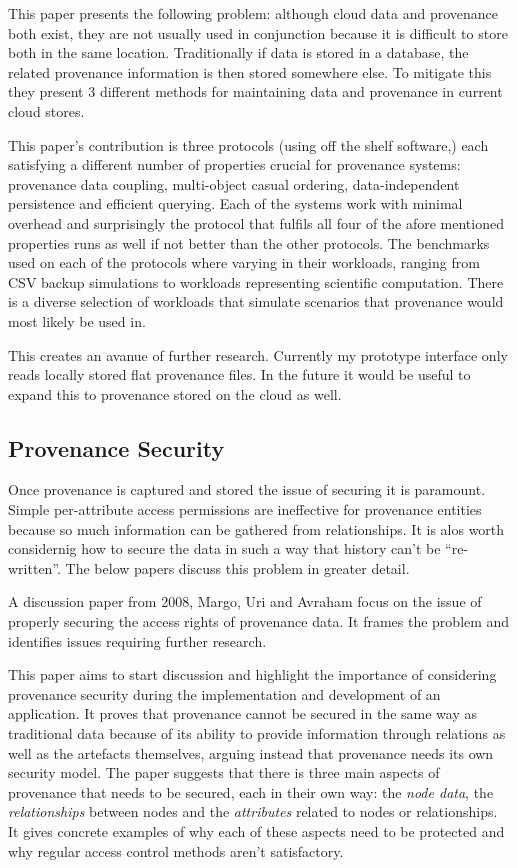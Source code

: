 This paper presents the following problem: although cloud data and provenance both exist, they are not usually used in conjunction because it is difficult to store both in the same location. Traditionally if data is stored in a database, the related provenance information is then stored somewhere else. To mitigate this they present 3 different methods for maintaining data and provenance in current cloud stores.

This paper's contribution is three protocols (using off the shelf software,) each satisfying a different number of properties crucial for provenance systems: provenance data coupling, multi-object casual ordering, data-independent persistence and efficient querying. Each of the systems work with minimal overhead and surprisingly the protocol that fulfils all four of the afore mentioned properties runs as well if not better than the other protocols. The benchmarks used on each of the protocols where varying in their workloads, ranging from CSV backup simulations to workloads representing scientific computation. There is a diverse selection of workloads that simulate scenarios that provenance would most likely be used in.

This creates an avanue of further research. Currently my prototype interface only reads locally stored flat provenance files. In the future it would be useful to expand this to provenance stored on the cloud as well.

\subsection{Provenance Security}
\label{sec:provenance_security}

Once provenance is captured and stored the issue of securing it is paramount. Simple per-attribute access permissions are ineffective for provenance entities because so much information can be gathered from relationships. It is alos worth considernig how to secure the data in such a way that history can't be ``re-written''. The below papers discuss this problem in greater detail.


A discussion paper from 2008, Margo, Uri and Avraham focus on the issue of properly securing the access rights of provenance data. It frames the problem and identifies issues requiring further research.

This paper aims to start discussion and highlight the importance of considering provenance security during the implementation and development of an application. It proves that provenance cannot be secured in the same way as traditional data because of its ability to provide information through relations as well as the artefacts themselves, arguing instead that provenance needs its own security model. The paper suggests that there is three main aspects of provenance that needs to be secured, each in their own way: the \textit{node data}, the \textit{relationships} between nodes and the \textit{attributes} related to nodes or relationships. It gives concrete examples of why each of these aspects need to be protected and why regular access control methods aren't satisfactory.

